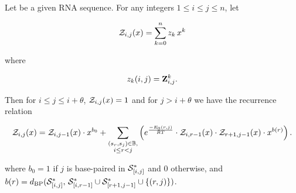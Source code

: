 \begin{theorem}
\label{thm:fftbor:recursions}
Let \seqN be a given RNA sequence.
For any integers $1 \leq i \leq j \leq n$, let

\begin{align}
{\mathcal Z}_{i,j}(x) = \sum_{k=0}^n z_k\,x^k
\end{align}

where

\begin{align}
z_k(i,j) = {\bf Z}^{k}_{i,j}.
\end{align}

Then for $i\leq j \leq i+\theta$, ${\mathcal Z}_{i,j}(x)=1$ and for
$j>i+\theta$ we have the recurrence relation

\begin{align}
\label{eq:fftbor:fftborNussPoly}
\emZ{i,j} = \emZ{i,j-1} \cdot x^{b_0} +
\sum_{\substack{(s_r,s_j) \in \bpSet, \\ i\le r<j}}
\left(
\boltzNuss{r,j} \cdot \emZ{i,r-1} \cdot \emZ{r+1,j-1} \cdot x^{b(r)}
\right).
\end{align}

where $b_0 = 1$ if $j$ is base-paired in $\mathcal S^*_{[i,j]}$ and 0 otherwise, and
$b(r) =
d_{\text{BP}}(\mathcal S^*_{[i,j]},\,\mathcal S^*_{[i,r-1]} \cup \mathcal S^*_{[r+1,j-1]} \cup \{(r,j)\})$.
\end{theorem}

